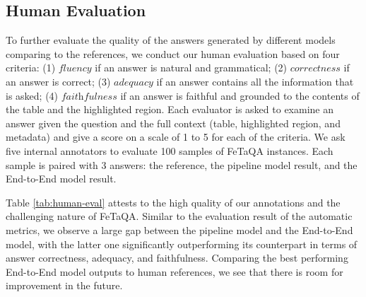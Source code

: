 \documentclass[11pt,a4paper]{article}
\newcommand{\ours}{FeTaQA\xspace}
\begin{document}
\subsection{Human Evaluation}
\label{sec:human-eval}
To further evaluate the quality of the answers generated by different models comparing to the references, we conduct our human evaluation based on four criteria: (1) $\textit{fluency}$ if an answer is natural and grammatical; (2) $\textit{correctness}$ if an answer is correct; (3) $\textit{adequacy}$ if an answer contains all the information that is asked; (4) $\textit{faithfulness}$ if an answer is faithful and grounded to the contents of the table and the highlighted region. Each evaluator is asked to examine an answer given the question and the full context (table, highlighted region, and metadata) and give a score on a scale of 1 to 5 for each of the criteria. We ask five internal annotators to evaluate 100 samples of \ours instances. Each sample is paired with 3 answers: the reference, the pipeline model result, and the End-to-End model result.

Table \ref{tab:human-eval} attests to the high quality of our annotations and the challenging nature of \ours. Similar to the evaluation result of the automatic metrics, we observe a large gap between the pipeline model and the End-to-End model, with the latter one significantly outperforming its counterpart in terms of answer correctness, adequacy, and faithfulness. Comparing the best performing End-to-End model outputs to human references, we see that there is room for improvement in the future. 
\end{document}

